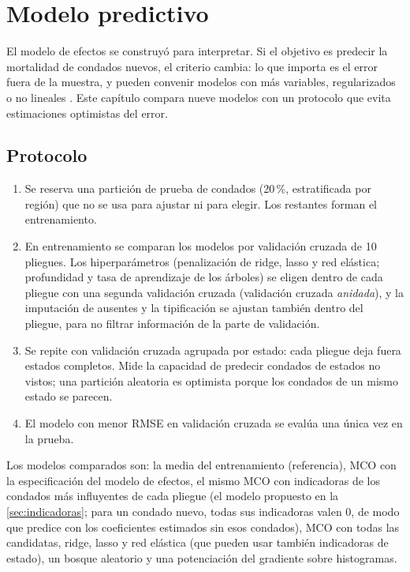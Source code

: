 \chapter{Modelo predictivo}\label{cap:prediccion}

El modelo de efectos se construyó para interpretar. Si el objetivo es predecir la mortalidad de
condados nuevos, el criterio cambia: lo que importa es el error fuera de la muestra, y pueden
convenir modelos con más variables, regularizados o no lineales \parencite{hastie2009}. Este
capítulo compara nueve modelos con un protocolo que evita estimaciones optimistas del error.

\section{Protocolo}

\begin{enumerate}
  \item Se reserva una partición de prueba de  condados (20\,\%, estratificada por
  región) que no se usa para ajustar ni para elegir. Los  restantes forman el
  entrenamiento.
  \item En entrenamiento se comparan los modelos por validación cruzada de 10 pliegues. Los
  hiperparámetros (penalización de ridge, lasso y red elástica; profundidad y tasa de aprendizaje de
  los árboles) se eligen dentro de cada pliegue con una segunda validación cruzada (validación
  cruzada \emph{anidada}), y la imputación de ausentes y la tipificación se ajustan también dentro
  del pliegue, para no filtrar información de la parte de validación.
  \item Se repite con validación cruzada agrupada por estado: cada pliegue deja fuera estados
  completos. Mide la capacidad de predecir condados de estados no vistos; una partición aleatoria es
  optimista porque los condados de un mismo estado se parecen.
  \item El modelo con menor RMSE en validación cruzada se evalúa una única vez en la prueba.
\end{enumerate}

Los modelos comparados son: la media del entrenamiento (referencia), MCO con la especificación
del modelo de efectos, el mismo MCO con indicadoras de los  condados más influyentes
de cada pliegue (el modelo propuesto en la \cref{sec:indicadoras}; para un condado nuevo, todas sus
indicadoras valen 0, de modo que predice con los coeficientes estimados sin esos condados), MCO con
todas las candidatas, ridge, lasso y red elástica (que pueden usar
también indicadoras de estado), un bosque aleatorio y una potenciación del gradiente sobre
histogramas.

